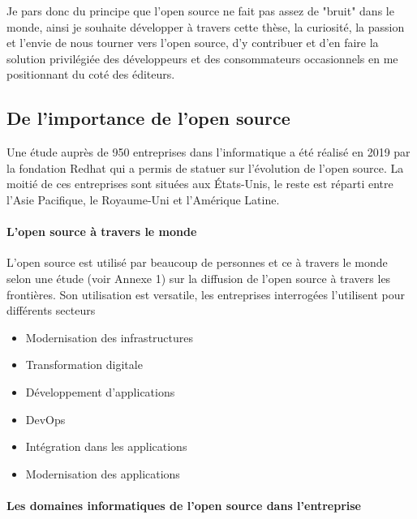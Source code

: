 			Je pars donc du principe que l'open source ne fait pas assez de "bruit" dans le monde, ainsi je souhaite développer à travers cette thèse, la curiosité, la passion et l'envie de nous tourner vers l'open source, d'y contribuer et d'en faire la solution privilégiée des développeurs et des consommateurs occasionnels en me positionnant du coté des éditeurs.

		\subsection{De l'importance de l'open source}

				Une étude auprès de 950 entreprises dans l'informatique a été réalisé en 2019 par la fondation Redhat qui a permis de statuer sur l'évolution de l'open source. La moitié de ces entreprises sont situées aux États-Unis, le reste est réparti entre l'Asie Pacifique, le Royaume-Uni et l'Amérique Latine.

				\paragraph{L'open source à travers le monde\\}

					L'open source est utilisé par beaucoup de personnes et ce à travers le monde selon une étude (voir Annexe 1) sur la diffusion de l'open source à travers les frontières.
					Son utilisation est versatile, les entreprises interrogées l'utilisent pour différents secteurs 

					\begin{itemize}[label=\textbullet, font=\LARGE \color{burntorange}]
					\item Modernisation des infrastructures
					\item Transformation digitale
					\item Développement d'applications
					\item DevOps
					\item Intégration dans les applications
					\item Modernisation des applications
					\end{itemize}

				\paragraph{Les domaines informatiques de l'open source dans l'entreprise\\}

